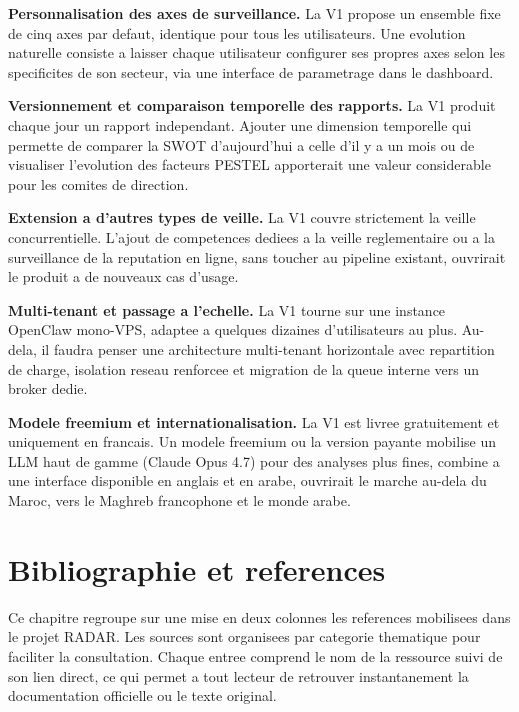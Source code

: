 \documentclass[12pt,a4paper,openany]{report}
\begin{document}
\textbf{Personnalisation des axes de surveillance.} La V1 propose un ensemble fixe de cinq axes par defaut, identique pour tous les utilisateurs. Une evolution naturelle consiste a laisser chaque utilisateur configurer ses propres axes selon les specificites de son secteur, via une interface de parametrage dans le dashboard.

\textbf{Versionnement et comparaison temporelle des rapports.} La V1 produit chaque jour un rapport independant. Ajouter une dimension temporelle qui permette de comparer la SWOT d'aujourd'hui a celle d'il y a un mois ou de visualiser l'evolution des facteurs PESTEL apporterait une valeur considerable pour les comites de direction.

\textbf{Extension a d'autres types de veille.} La V1 couvre strictement la veille concurrentielle. L'ajout de competences dediees a la veille reglementaire ou a la surveillance de la reputation en ligne, sans toucher au pipeline existant, ouvrirait le produit a de nouveaux cas d'usage.

\textbf{Multi-tenant et passage a l'echelle.} La V1 tourne sur une instance OpenClaw mono-VPS, adaptee a quelques dizaines d'utilisateurs au plus. Au-dela, il faudra penser une architecture multi-tenant horizontale avec repartition de charge, isolation reseau renforcee et migration de la queue interne vers un broker dedie.

\textbf{Modele freemium et internationalisation.} La V1 est livree gratuitement et uniquement en francais. Un modele freemium ou la version payante mobilise un LLM haut de gamme (Claude Opus 4.7) pour des analyses plus fines, combine a une interface disponible en anglais et en arabe, ouvrirait le marche au-dela du Maroc, vers le Maghreb francophone et le monde arabe.

\chapter{Bibliographie et references}
\label{chap:bibliographie}

Ce chapitre regroupe sur une mise en deux colonnes les references mobilisees dans le projet RADAR. Les sources sont organisees par categorie thematique pour faciliter la consultation. Chaque entree comprend le nom de la ressource suivi de son lien direct, ce qui permet a tout lecteur de retrouver instantanement la documentation officielle ou le texte original.
\end{document}
